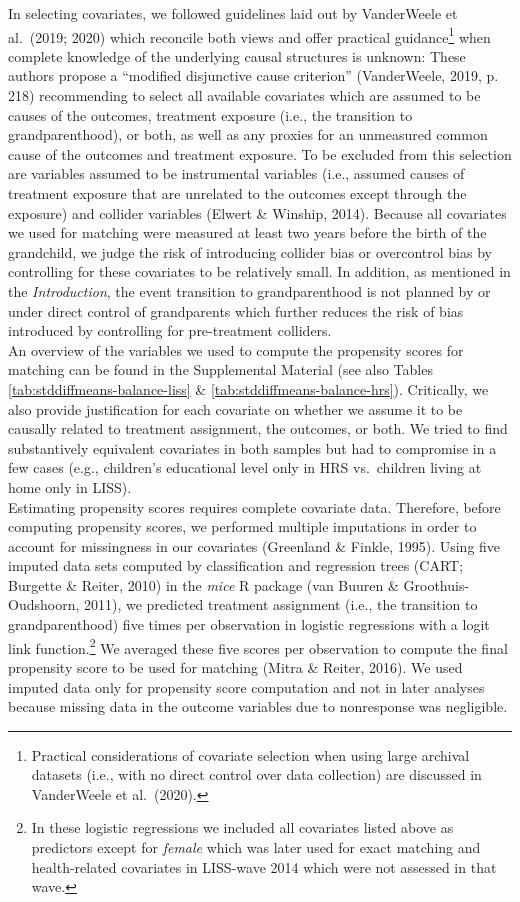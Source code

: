\documentclass[
  english,
  man, noextraspace]{apa7}
\begin{document}
In selecting covariates, we followed guidelines laid out by VanderWeele et al.~(2019; 2020) which reconcile both views and offer practical guidance\footnote{Practical considerations of covariate selection when using large archival datasets (i.e., with no direct control over data collection) are discussed in VanderWeele et al.~(2020).} when complete knowledge of the underlying causal structures is unknown: These authors propose a \enquote{modified disjunctive cause criterion} (VanderWeele, 2019, p. 218) recommending to select all available covariates which are assumed to be causes of the outcomes, treatment exposure (i.e., the transition to grandparenthood), or both, as well as any proxies for an unmeasured common cause of the outcomes and treatment exposure. To be excluded from this selection are variables assumed to be instrumental variables (i.e., assumed causes of treatment exposure that are unrelated to the outcomes except through the exposure) and collider variables (Elwert \& Winship, 2014). Because all covariates we used for matching were measured at least two years before the birth of the grandchild, we judge the risk of introducing collider bias or overcontrol bias by controlling for these covariates to be relatively small. In addition, as mentioned in the \emph{Introduction}, the event transition to grandparenthood is not planned by or under direct control of grandparents which further reduces the risk of bias introduced by controlling for pre-treatment colliders.\\
An overview of the variables we used to compute the propensity scores for matching can be found in the Supplemental Material (see also Tables \ref{tab:stddiffmeans-balance-liss} \& \ref{tab:stddiffmeans-balance-hrs}). Critically, we also provide justification for each covariate on whether we assume it to be causally related to treatment assignment, the outcomes, or both. We tried to find substantively equivalent covariates in both samples but had to compromise in a few cases (e.g., children's educational level only in HRS vs.~children living at home only in LISS).\\
Estimating propensity scores requires complete covariate data. Therefore, before computing propensity scores, we performed multiple imputations in order to account for missingness in our covariates (Greenland \& Finkle, 1995). Using five imputed data sets computed by classification and regression trees (CART; Burgette \& Reiter, 2010) in the \emph{mice} R package (van Buuren \& Groothuis-Oudshoorn, 2011), we predicted treatment assignment (i.e., the transition to grandparenthood) five times per observation in logistic regressions with a logit link function.\footnote{In these logistic regressions we included all covariates listed above as predictors except for \emph{female} which was later used for exact matching and health-related covariates in LISS-wave 2014 which were not assessed in that wave.} We averaged these five scores per observation to compute the final propensity score to be used for matching (Mitra \& Reiter, 2016). We used imputed data only for propensity score computation and not in later analyses because missing data in the outcome variables due to nonresponse was negligible.
\end{document}
